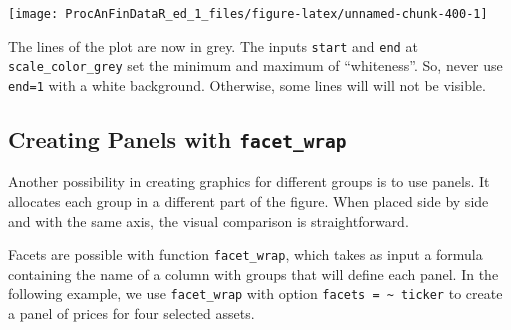\documentclass[11pt,]{book}
\newenvironment{Shaded}{\begin{snugshade}}{\end{snugshade}}
\newcommand{\KeywordTok}[1]{\textcolor[rgb]{0.27,0.27,0.27}{\textbf{#1}}}
\newcommand{\DataTypeTok}[1]{\textcolor[rgb]{0.27,0.27,0.27}{#1}}
\newcommand{\DecValTok}[1]{\textcolor[rgb]{0.06,0.06,0.06}{#1}}
\newcommand{\StringTok}[1]{\textcolor[rgb]{0.5,0.5,0.5}{#1}}
\newcommand{\CommentTok}[1]{\textcolor[rgb]{0.56,0.35,0.01}{\textit{#1}}}
\newcommand{\OperatorTok}[1]{\textcolor[rgb]{0.81,0.36,0.00}{\textbf{#1}}}
\newcommand{\NormalTok}[1]{#1}
\begin{document}
\begin{center}\texttt{[image: ProcAnFinDataR\_ed\_1\_files/figure-latex/unnamed-chunk-400-1]} \end{center}

The lines of the plot are now in grey. The inputs \texttt{start} and
\texttt{end} at \texttt{scale\_color\_grey} set the minimum and maximum
of ``whiteness''. So, never use \texttt{end=1} with a white background.
Otherwise, some lines will will not be visible.

\subsection{\texorpdfstring{Creating Panels with
\texttt{facet\_wrap}}{Creating Panels with facet\_wrap}}\label{creating-panels-with-facet_wrap}

Another possibility in creating graphics for different groups is to use
panels. It allocates each group in a different part of the figure. When
placed side by side and with the same axis, the visual comparison is
straightforward.

Facets are possible with function \texttt{facet\_wrap}, which takes as
input a formula containing the name of a column with groups that will
define each panel. In the following example, we use \texttt{facet\_wrap}
with option \texttt{facets\ =\ \textasciitilde{}\ ticker} to create a
panel of prices for four selected assets. 

\begin{Shaded}
\end{Shaded}
\end{document}
